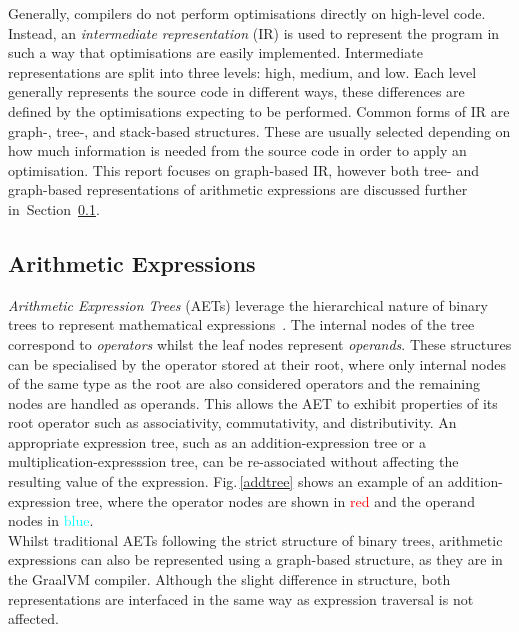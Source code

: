\documentclass[12pt,openany,a4paper]{book}
\newcommand{\fig}[1]  {Fig.\,\ref{#1}}		%
\newcommand{\secn}[1] {Section~\ref{#1}}	%
\begin{document}
Generally, compilers do not perform optimisations directly on high-level code.
Instead, an \emph{intermediate representation} (IR) is used to represent the
program in such a way that optimisations are easily implemented. Intermediate
representations are split into three levels: high, medium, and low. Each
level generally represents the source code in different ways, these differences
are defined by the optimisations expecting to be performed.
Common forms of IR are graph-, tree-, and stack-based structures. These are
usually selected depending on how much information is needed from the source
code in order to apply an optimisation.
This report focuses on graph-based IR, however both tree- and 
graph-based representations of arithmetic expressions are discussed further 
in~\secn{exptrees}.

\subsection{Arithmetic Expressions}
\label{exptrees}

\emph{Arithmetic Expression Trees} (AETs) leverage the hierarchical nature
of binary trees to represent mathematical expressions~\cite{exptrees}. The internal
nodes of the tree correspond to \emph{operators} whilst the leaf nodes
represent \emph{operands}. These structures can be specialised by the 
operator stored at their root, where only internal nodes of the same 
type as the root are also considered operators and the remaining
nodes are handled as operands. This allows the AET to exhibit properties
of its root operator such as associativity, commutativity, and distributivity.
An appropriate expression tree, such as an addition-expression tree or a
multiplication-expresssion tree, can be re-associated without affecting the
resulting value of the expression.
\fig{addtree} shows an example of an addition-expression tree, where the
operator nodes are shown in \textcolor{red}{red} and the operand nodes in
\textcolor{cyan}{blue}. \\
Whilst traditional AETs following the strict structure
of binary trees, arithmetic expressions can also be represented using a
graph-based structure, as they are in the GraalVM compiler. 
Although the slight difference in structure, both representations
are interfaced in the same way as expression traversal is not affected.
\end{document}
